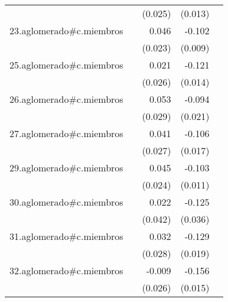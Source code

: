 {\begin{longtable}{l*{4}{D{.}{.}{-1}}}
            &                     &     (0.025)         &     (0.013)         &                     \\
\addlinespace
23.aglomerado#c.miembros&                     &       0.046\sym{*}  &      -0.102\sym{***}&                     \\
            &                     &     (0.023)         &     (0.009)         &                     \\
\addlinespace
25.aglomerado#c.miembros&                     &       0.021         &      -0.121\sym{***}&                     \\
            &                     &     (0.026)         &     (0.014)         &                     \\
\addlinespace
26.aglomerado#c.miembros&                     &       0.053         &      -0.094\sym{***}&                     \\
            &                     &     (0.029)         &     (0.021)         &                     \\
\addlinespace
27.aglomerado#c.miembros&                     &       0.041         &      -0.106\sym{***}&                     \\
            &                     &     (0.027)         &     (0.017)         &                     \\
\addlinespace
29.aglomerado#c.miembros&                     &       0.045         &      -0.103\sym{***}&                     \\
            &                     &     (0.024)         &     (0.011)         &                     \\
\addlinespace
30.aglomerado#c.miembros&                     &       0.022         &      -0.125\sym{***}&                     \\
            &                     &     (0.042)         &     (0.036)         &                     \\
\addlinespace
31.aglomerado#c.miembros&                     &       0.032         &      -0.129\sym{***}&                     \\
            &                     &     (0.028)         &     (0.019)         &                     \\
\addlinespace
32.aglomerado#c.miembros&                     &      -0.009         &      -0.156\sym{***}&                     \\
            &                     &     (0.026)         &     (0.015)         &                     \\

\end{longtable}}
